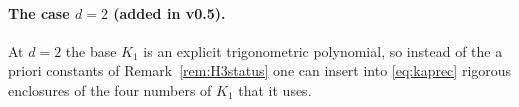 \providecommand{\DtwoCertBound}{1.187}
\providecommand{\DtwoCertMinRad}{0.842}
\providecommand{\DtwoCertBoundHalf}{1.202}
\providecommand{\DtwoCertBoundTF}{0.245}
\providecommand{\DtwoCertBoundQ}{0.0891}
\providecommand{\DtwoCertVmin}{1.798}
\providecommand{\DtwoCertKmax}{1.427}
\providecommand{\DtwoCertNu}{0.433}
\providecommand{\DtwoCertMu}{4.638}
\providecommand{\DtwoCertNs}{4096}
\providecommand{\DtwoCertNsB}{2048}
\providecommand{\DtwoCertNrB}{512}
\providecommand{\DtwoCertFc}{0.484375}
\providecommand{\DtwoCertCPU}{8}
\providecommand{\JointNEvals}{594}
\providecommand{\JointMarginMin}{0.233}
\providecommand{\JointMarginMinFine}{0.232}
\providecommand{\JointBetaOne}{1.058}
\providecommand{\JointBetaTwo}{0.671}
\providecommand{\JointMarginMax}{13.2}
\providecommand{\JointPeriodDev}{0.05}

\paragraph{The case $d=2$ (added in v0.5).} At $d=2$ the base $K_1$ is an explicit trigonometric polynomial, so instead of the a priori constants of Remark~\ref{rem:H3status} one can insert into \eqref{eq:kaprec} rigorous enclosures of the four numbers of $K_1$ that it uses.

